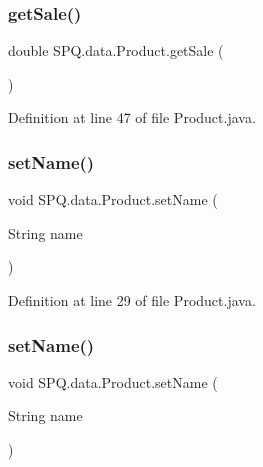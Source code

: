 \subsubsection{\texorpdfstring{get\+Sale()}{getSale()}\hspace{0.1cm}{\footnotesize\ttfamily [2/2]}}
{\footnotesize\ttfamily double S\+P\+Q.\+data.\+Product.\+get\+Sale (\begin{DoxyParamCaption}{ }\end{DoxyParamCaption})}



Definition at line 47 of file Product.\+java.

\mbox{\label{class_s_p_q_1_1data_1_1_product_a257a5e290694db0588a9ac9aad598360}} 
\subsubsection{\texorpdfstring{set\+Name()}{setName()}\hspace{0.1cm}{\footnotesize\ttfamily [1/2]}}
{\footnotesize\ttfamily void S\+P\+Q.\+data.\+Product.\+set\+Name (\begin{DoxyParamCaption}\item[{String}]{name }\end{DoxyParamCaption})}



Definition at line 29 of file Product.\+java.

\mbox{\label{class_s_p_q_1_1data_1_1_product_a257a5e290694db0588a9ac9aad598360}} 
\subsubsection{\texorpdfstring{set\+Name()}{setName()}\hspace{0.1cm}{\footnotesize\ttfamily [2/2]}}
{\footnotesize\ttfamily void S\+P\+Q.\+data.\+Product.\+set\+Name (\begin{DoxyParamCaption}\item[{String}]{name }\end{DoxyParamCaption})}



